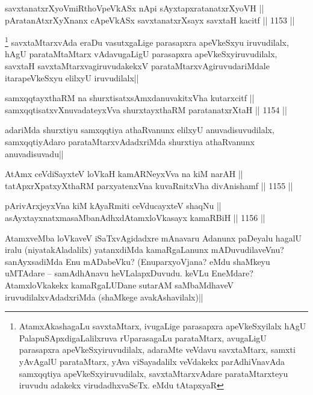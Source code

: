 \begin{shl}
savxtanatxrXyoVmiRthoV\s peVkASx nApi sAyxtapxratanatxrXyoVH || \\
pAratanAtxrXyXnanx cApeVkASx savxtanatxrXsayx savxtaH kacitf ||  1153 ||  
\end{shl}

\begin{artha}
\footnote{AtamxAkashagaLu savxtaMtarx, ivugaLige parasapxra apeVkeSxyilalx hAgU PalapuSApxdigaLalilxruva rUparasagaLu parataMtarx, avugaLigU parasapxra apeVkeSxyiruvudilalx, adaraMte veVdavu savxtaMtarx, samxti yAvAgalU parataMtarx, yAva viSayadalilx veVdakekx parAdhiVnavAda samxqqtiya apeVkeSxyiruvudilalx, savxtaMtarxvAdare parataMtarxteyu iruvudu adakekx virudadhxvaSeTx. eMdu tAtapxyaR} savxtaMtarxvAda eraDu vasutxgaLige parasapxra apeVkeSxyu iruvudilalx, hAgU parataMtaMtarx vAdavugaLigU parasapxra apeVkeSxyiruvudilalx, savxtaH savxtaMtarxvagiruvudakekxV parataMtarxvAgiruvudariMdale itarapeVkeSxyu elilxyU iruvudilalx||
\end{artha}

\begin{shl}
samxqqtayxthaRM na shurxtisatxsAmxdanuvakitxVha kutarxcitf ||  \\
samxqqtisatxvXnuvadateyxVva shurxtayxthaRM paratanatxrXtaH ||  1154 ||  
\end{shl}

\begin{artha}
adariMda shurxtiyu samxqqtiya athaRvanunx elilxyU anuvadisuvudilalx, samxqqtiyAdaro parataMtarxvAdadxriMda shurxtiya athaRvanunx anuvadisuvadu||
\end{artha}


\begin{shl}
AtAmx ceVdiSayxteV loVkaH kamARNeyxVva na kiM narAH || \\
tatApxrXpatxyXthaRM parxyatenxVna kuvaRnitxVha divAnishamf ||  1155 ||  
\end{shl}
				
\begin{shl}
pArivArxjeyxVna kiM kAyaRmiti ceVducayxteV shaqNu || \\
asAyxtayxnatxmasaMbanAdhxdAtamxloVkasayx kamaRBiH ||  1156 ||  
\end{shl}

\begin{artha}
AtamxveMba loVkaveV iSaTxvAgidadxre mAnavaru Adanunx paDeyalu hagalU iralu (niyatakAladalilx) yatanxdiMda kamaRgaLanunx mADuvudilaveVnu? sanAyxsadiMda Enu mADabeVku? (EnuparxyoVjana? eMdu shaMkeyu uMTAdare -- samAdhAnavu heVLalapxDuvudu. keVLu EneMdare? AtamxloVkakekx kamaRgaLUDane sutarAM saMbaMdhaveV iruvudilalxvAdadxriMda (shaMkege avakAshavilalx)||
\end{artha}

